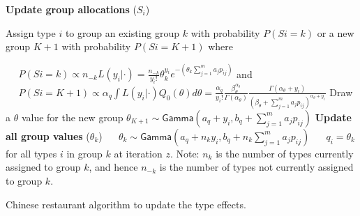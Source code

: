 \begin{algorithm}
\begin{algorithmic} 
\bigskip{}



\State \textbf{Update group allocations} ($S_{i}$)
\State \parbox[t]{\dimexpr\linewidth-\algorithmicindent\relax}{%
    \setlength{\hangindent}{\algorithmicindent}%
      Assign type $i$ to group an existing group $k$ with probability $P(Si=k)$ or a new group $K+1$ with probability $P(Si=K+1)$ where}\strut
\State $\>\>\>\>\>\> P(Si=k)\propto n_{-k} L\left(y_{i}|\cdot\right)= \frac{n_{-k}}{y_i!} \theta_{k}^{y_{i}} e^{-\left(\theta_{k}\sum_{j=1}^{m}
a_{j}p_{ij}\right)}$ and
\State $\>\>\>\>\>\> P\left(Si=K+1\right)\propto\alpha_q\int L\left(y_{i}|\cdot\right) Q_{0}\left(\theta\right)d\theta=\frac{\alpha_q}{y_i!}\frac{\beta_{\theta}^{\alpha_{\theta}}}{\Gamma
\left(\alpha_{\theta}\right)}\frac{\Gamma\left(\alpha_{\theta}+y_{i}\right)}{\left(\beta_{\theta}+\sum_{j=1}^{m}a_{j}p_{ij}\right)^{\alpha_{\theta}+y_{i}}}$
\State Draw a $\theta$ value for the new group
\State $\theta_{K+1} \sim \textsf{Gamma}\left(a_{q}+y_{i}, b_{q}+\sum_{j=1}^{m}a_{j} p_{ij}\right)$
\EndIf
\EndFor
\medskip{}
\State \textbf{Update all group values} ($\theta_{k}$)
\State $\>\>\>\>\>\> \theta_{k} \sim \textsf{Gamma}\left(a_{q}+n_{k} y_{i}, b_{q}+n_{k} \sum_{j=1}^{m}a_{j} p_{ij}\right)$
\State $\>\>\>\>\>\> q_{i}=\theta_{k}$ for all types $i$ in group $k$ at iteration $z$.
\EndFor
\State Note: $n_{k}$ is the number of types currently assigned to group $k$, and hence $n_{-k}$ is the number of types not currently assigned to group $k$.
\bigskip{}
\end{algorithmic}
\caption{Chinese restaurant algorithm to update the type effects.}
\label{alg:mcmc}
\end{algorithm}

